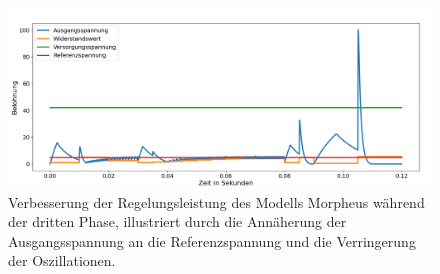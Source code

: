 \begin{figure}[htbp]
\centering
\includegraphics[width=\textwidth]{4Ergebnisse/Phasen/2Phase/TeilIII_2.png}
\caption{Verbesserung der Regelungsleistung des Modells Morpheus während der dritten Phase, illustriert durch die Annäherung der Ausgangsspannung an die Referenzspannung und die Verringerung der Oszillationen.}
\label{fig:phase_iii_morpheus}
\end{figure}

